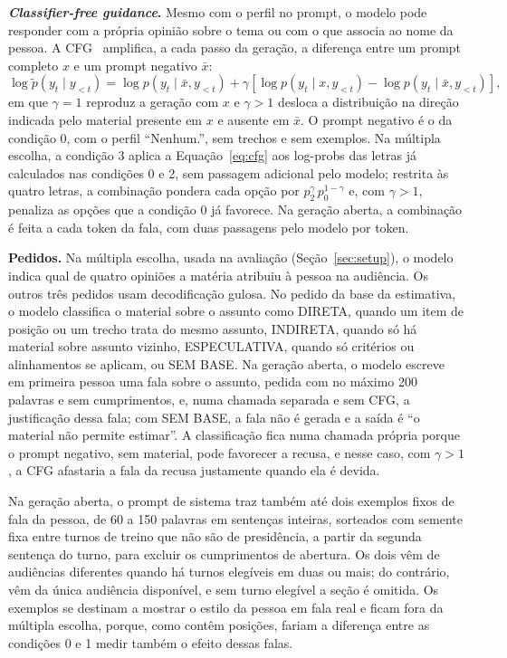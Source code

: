 \textbf{\textit{Classifier-free guidance}.} Mesmo com o perfil no prompt, o modelo pode responder com a
própria opinião sobre o tema ou com o que associa ao nome da pessoa. A
CFG~\citep{ho2022classifier,sanchez2024stay} amplifica, a cada passo da geração, a diferença entre um
prompt completo $x$ e um prompt negativo $\bar{x}$:
\begin{equation}
  \log \tilde{p}(y_t \mid y_{<t}) = \log p(y_t \mid \bar{x}, y_{<t})
  + \gamma \left[ \log p(y_t \mid x, y_{<t}) - \log p(y_t \mid \bar{x}, y_{<t}) \right],
  \label{eq:cfg}
\end{equation}
em que $\gamma = 1$ reproduz a geração com $x$ e $\gamma > 1$ desloca a distribuição na direção
indicada pelo material presente em $x$ e ausente em $\bar{x}$. O prompt negativo é o da condição 0,
com o perfil ``Nenhum.'', sem trechos e sem exemplos. Na múltipla escolha, a condição 3 aplica a
Equação~\ref{eq:cfg} aos log-probs das letras já calculados nas condições 0 e 2, sem passagem
adicional pelo modelo; restrita às quatro letras, a combinação pondera cada opção por
$p_2^{\gamma}\, p_0^{1-\gamma}$ e, com $\gamma > 1$, penaliza as opções que a condição 0 já favorece.
Na geração aberta, a combinação é feita a cada token da fala, com duas passagens pelo modelo por token.

\textbf{Pedidos.} Na múltipla escolha, usada na avaliação (Seção~\ref{sec:setup}), o modelo indica
qual de quatro opiniões a matéria atribuiu à pessoa na audiência. Os outros três pedidos usam
decodificação gulosa. No pedido da base da estimativa, o modelo classifica o material sobre o assunto
como DIRETA, quando um item de posição ou um trecho trata do mesmo assunto, INDIRETA, quando só há
material sobre assunto vizinho, ESPECULATIVA, quando só critérios ou alinhamentos se aplicam, ou SEM
BASE. Na geração aberta, o modelo escreve em primeira pessoa uma fala sobre o assunto, pedida com no
máximo 200 palavras e sem cumprimentos, e, numa chamada separada e sem CFG, a justificação dessa fala;
com SEM BASE, a fala não é gerada e a saída é ``o material não permite estimar''. A classificação fica
numa chamada própria porque o prompt negativo, sem material, pode favorecer a recusa, e nesse caso,
com $\gamma > 1$, a CFG afastaria a fala da recusa justamente quando ela é devida.

Na geração aberta, o prompt de sistema traz também até dois exemplos fixos de fala da pessoa, de 60 a
150 palavras em sentenças inteiras, sorteados com semente fixa entre turnos de treino que não são de
presidência, a partir da segunda sentença do turno, para excluir os cumprimentos de abertura. Os dois
vêm de audiências diferentes quando há turnos elegíveis em duas ou mais; do contrário, vêm da única
audiência disponível, e sem turno elegível a seção é omitida. Os exemplos se destinam a mostrar o
estilo da pessoa em fala real e ficam fora da múltipla escolha, porque, como contêm posições, fariam
a diferença entre as condições 0 e 1 medir também o efeito dessas falas.

